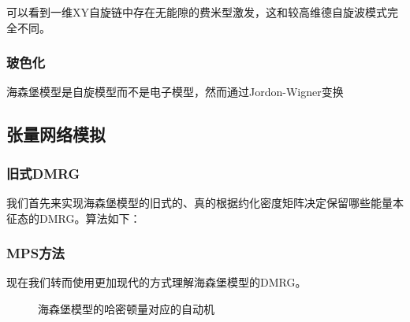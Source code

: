 可以看到一维XY自旋链中存在无能隙的费米型激发，这和较高维德自旋波模式完全不同。

\subsubsection{玻色化}

海森堡模型是自旋模型而不是电子模型，然而通过Jordon-Wigner变换 %

\subsection{张量网络模拟}



\subsubsection{旧式DMRG}

我们首先来实现海森堡模型的旧式的、真的根据约化密度矩阵决定保留哪些能量本征态的DMRG。算法如下：


\subsubsection{MPS方法}

现在我们转而使用更加现代的方式理解海森堡模型的DMRG。

\begin{figure}
    \centering
    
    \caption{海森堡模型的哈密顿量对应的自动机}
    \label{fig:heisenberg-automata}
\end{figure}

